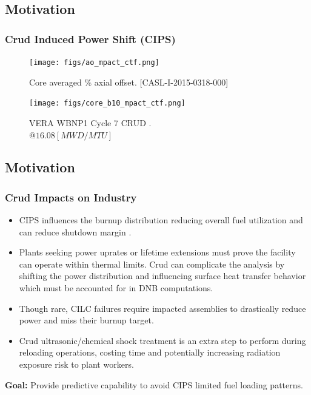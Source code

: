 \documentclass[t, pdftex]{beamer}
\begin{document}
\subsection*{Motivation}
\begin{frame}
    \frametitle{Crud Induced Power Shift (CIPS)}
    \begin{figure}
        \centering
        \begin{minipage}{.5\textwidth}
            \centering
            \texttt{[image: figs/ao\_mpact\_ctf.png]}
            \caption{Core averaged \% axial offset.  [CASL-I-2015-0318-000]}
        \end{minipage}%
        \begin{minipage}{.5\textwidth}
            \centering
            \texttt{[image: figs/core\_b10\_mpact\_ctf.png]}
            \caption{VERA WBNP1 Cycle 7 CRUD . \\ $@ 16.08 [MWD/MTU]$}
        \end{minipage}
    \end{figure}
\end{frame}

\subsection*{Motivation}
\begin{frame}
\frametitle{Crud Impacts on Industry}
\vspace{-12pt}
\begin{itemize}
    \item CIPS influences the burnup distribution reducing overall fuel utilization and can reduce shutdown margin  \cite{lange17}.
    \item Plants seeking power uprates or lifetime extensions must prove the facility can operate within thermal limits.  Crud can complicate the analysis by shifting the power distribution and influencing surface heat transfer behavior which must be accounted for in DNB computations.
    \item Though rare, CILC failures require impacted assemblies to drastically reduce power and miss their burnup target.
    \item Crud ultrasonic/chemical shock treatment is an extra step to perform during reloading operations, costing time and potentially increasing radiation exposure risk to plant workers.
\end{itemize}
\textbf{Goal:} Provide predictive capability to avoid CIPS limited fuel loading patterns.
\end{frame}
\end{document}
